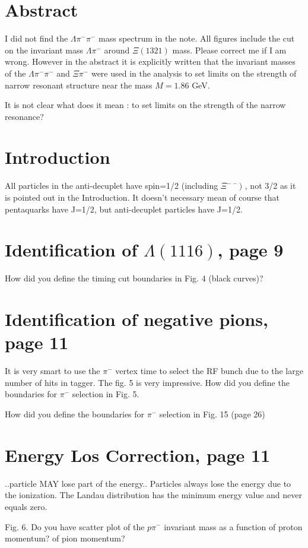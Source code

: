 \documentclass[12pt]{article}
\begin{document}
\section*{Abstract}
I did not find the $\Lambda\pi^-\pi^-$ mass spectrum in the note. All figures include the cut
on the invariant mass $\Lambda\pi^-$ around $\Xi(1321)$ mass. Please correct me if I am wrong.
However in the abstract it is explicitly written that the invariant masses of the $\Lambda\pi^-\pi^-$
and $\Xi\pi^-$ were used in the analysis to set limits on the strength of narrow resonant structure near the mass
$M=1.86$ GeV. 

It is not clear what does it mean : to set limits on the strength of the narrow resonance? 

\section*{Introduction}
All particles in the anti-decuplet have spin=1/2 (including $\Xi^{--})$ , not 3/2 as it is pointed out in the Introduction.
It doesn't necessary mean of course that pentaquarks have J=1/2, but anti-decuplet particles have J=1/2.

\section*{Identification of $\Lambda(1116)$, page 9}
How did you define the timing cut boundaries in Fig. 4 (black curves)?

\section*{Identification of negative pions, page 11}
It is very smart to use the $\pi^-$ vertex time to select the RF bunch due to the large number of hits in tagger.
The fig. 5 is very impressive.
How did you define the boundaries for $\pi^-$ selection in Fig. 5.

How did you define the boundaries for $\pi^-$ selection in Fig. 15 (page 26)

\section*{Energy Los Correction, page 11}

..particle MAY lose part of the energy..
Particles always lose the energy due to the ionization. 
The Landau distribution has the minimum energy value and never equals zero.

Fig. 6. Do you have scatter plot of the $p\pi^-$ invariant mass as a function of proton momentum? 
of pion momentum?
\end{document}
